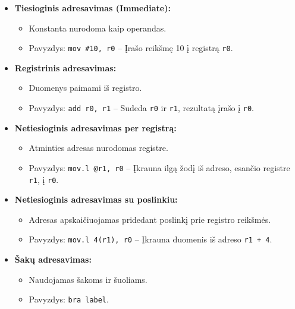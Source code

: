 \documentclass{article}
\begin{document}
\begin{itemize}
    \item \textbf{Tiesioginis adresavimas (Immediate):}
        \begin{itemize}
            \item Konstanta nurodoma kaip operandas.
            \item Pavyzdys: \texttt{mov \#10, r0} – Įrašo reikšmę 10 į registrą \texttt{r0}.
        \end{itemize}
    \item \textbf{Registrinis adresavimas:}
        \begin{itemize}
            \item Duomenys paimami iš registro.
            \item Pavyzdys: \texttt{add r0, r1} – Sudeda \texttt{r0} ir \texttt{r1}, rezultatą įrašo į \texttt{r0}.
        \end{itemize}
    \item \textbf{Netiesioginis adresavimas per registrą:}
        \begin{itemize}
            \item Atminties adresas nurodomas registre.
            \item Pavyzdys: \texttt{mov.l @r1, r0} – Įkrauna ilgą žodį iš adreso, esančio registre \texttt{r1}, į \texttt{r0}.
        \end{itemize}
    \item \textbf{Netiesioginis adresavimas su poslinkiu:}
        \begin{itemize}
            \item Adresas apskaičiuojamas pridedant poslinkį prie registro reikšmės.
            \item Pavyzdys: \texttt{mov.l 4(r1), r0} – Įkrauna duomenis iš adreso \texttt{r1 + 4}.
        \end{itemize}
    \item \textbf{Šakų adresavimas:}
        \begin{itemize}
            \item Naudojamas šakoms ir šuoliams.
            \item Pavyzdys: \texttt{bra label}.
        \end{itemize}
\end{itemize}
\end{document}

